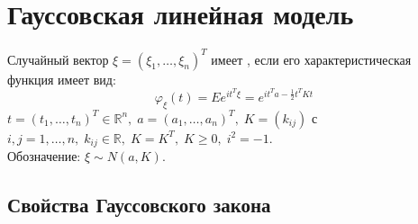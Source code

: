\chapter{Гауссовская линейная модель} 

\begin{definition}
    Случайный вектор $ \xi = (\xi_1, \ldots, \xi_n)^T $ имеет , если его характеристическая функция имеет вид:
    $$\varphi_{\xi}(t)=Ee^{it^T\xi} = e^{it^Ta - \frac{1}{2}t^TKt}$$
     $ t = (t_1, \ldots, t_n)^T \in \mathbb{R}^n, \; a = (a_1, \ldots, a_n)^T, \; K = (k_{ij}) $ с $ i,j = 1, \ldots, n, \; k_{ij} \in \mathbb{R}, \; K = K^T, \; K \geqslant 0, \; i^2 = -1$. \\Обозначение: $ \xi \sim N(a,K) $.
 \end{definition}

\section{Свойства Гауссовского закона}

